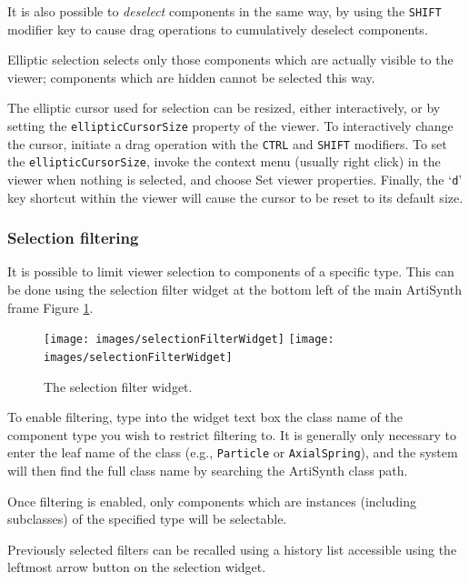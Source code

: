 \documentclass{article}
\begin{document}
It is also possible to {\it deselect} components in the same way, by
using the {\tt SHIFT} modifier key to cause drag operations to
cumulatively deselect components.
	
\begin{sideblock}
Elliptic selection selects only those components which are actually
visible to the viewer; components which are hidden cannot be selected
this way.
\end{sideblock}

The elliptic cursor used for selection can be resized, either
interactively, or by setting the {\tt ellipticCursorSize} property of
the viewer. To interactively change the cursor, initiate a drag
operation with the {\tt CTRL} and {\tt SHIFT} modifiers.
To set the {\tt ellipticCursorSize}, invoke the context menu
(usually right click) in the viewer when nothing is selected, and
choose {\sf Set viewer properties}. Finally, the `{\tt d}' key
shortcut within the viewer will cause the cursor to be reset to its
default size.

\subsubsection{Selection filtering}
\label{selectionFiltersSec}

It is possible to limit viewer selection to components of a specific
type. This can be done using the selection filter widget at the bottom
left of the main ArtiSynth frame Figure
\ref{selectionFilterWidgetFig}.

\begin{figure}
\begin{center}
\iflatexml
\texttt{[image: images/selectionFilterWidget]}
\else
\texttt{[image: images/selectionFilterWidget]}
\fi
\end{center}
\caption{The selection filter widget.}%
\label{selectionFilterWidgetFig}
\end{figure}

To enable filtering, type into the widget text box the class name of
the component type you wish to restrict filtering to. It is generally
only necessary to enter the leaf name of the class (e.g., {\tt Particle}
or {\tt AxialSpring}), and the system will then find the full
class name by searching the ArtiSynth class path.

Once filtering is enabled, only components which are instances
(including subclasses) of the specified type will be selectable.

Previously selected filters can be recalled using a history
list accessible using the leftmost arrow button on the
selection widget.
\end{document}
